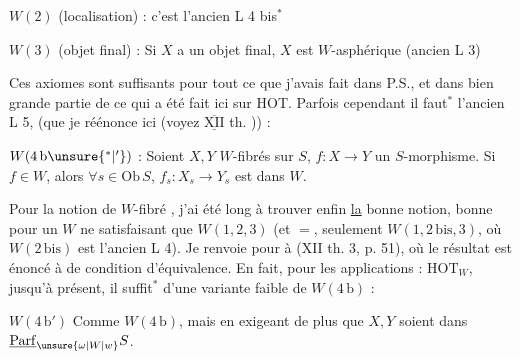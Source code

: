 $W(2)$ (localisation) : c'est l'ancien L 4 bis$^*$

$W(3)$ (objet final) : Si $X$ a un objet final, $X$ est $W$-asphérique (ancien L 3)


Ces   axiomes sont suffisants pour tout ce que j'avais fait dans P.S., et dans bien grande partie de ce qui a été fait ici sur HOT. Parfois cependant il faut$^*$ l'ancien L 5, (que je réénonce ici (voyez $\overline{\underline{\mathrm{XII}}}$ th. )) :

$W(4\,\mathrm b\unsure{{}^*|{}'})$ : Soient $X,Y$ $W$-fibrés sur $S$, $f:X\longrightarrow Y$ un $S$-morphisme. Si $f\in W$, alors $\forall s\in\mathrm{Ob}\,S$, $f_s:X_s\longrightarrow Y_s$ est dans $W$.

Pour la notion de $W$-fibré , j'ai été long à trouver enfin \uline{la} bonne notion,  bonne pour un $W$ ne satisfaisant que $W(1,2,3)$ (et $=$, seulement $W(1,2\,\mathrm{bis},3)$, où $W(2\,\mathrm{bis})$ est l'ancien L 4). Je renvoie pour  à (XII th. 3, p. 51), où le  résultat est énoncé à  de condition d'équivalence. En fait, pour les applications  : $\mathrm{HOT}_W$,  jusqu'à présent, il suffit$^*$ d'une variante faible de $W(4\,\mathrm b)$ :


$W(4\,\mathrm b')$ Comme $W(4\,\mathrm b)$, mais en exigeant de plus que $X,Y$ soient dans $\underline{\mathrm{Parf}}_{\unsure{\omega|W|w}} S$.


